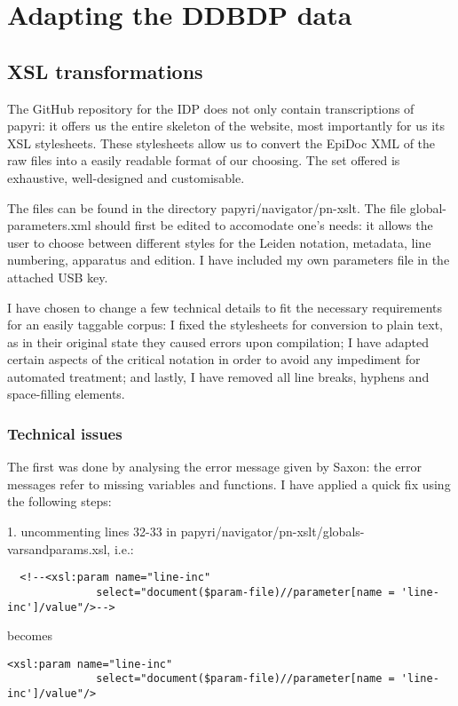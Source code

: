\chapter{Adapting the DDBDP data}
\label{chp:adaptation}
\minitoc\mtcskip
\section{XSL transformations}
\label{sect:xslt}
The GitHub repository for the IDP does not only contain transcriptions
of papyri: it offers us the entire skeleton of the website, most
importantly for us its XSL stylesheets. These stylesheets allow us to
convert the EpiDoc XML of the raw files into a easily readable format of
our choosing. The set offered is exhaustive, well-designed and
customisable.

The files can be found in the directory papyri/navigator/pn-xslt. The
file global-parameters.xml should first be edited to accomodate one's
needs: it allows the user to choose between different styles for the
Leiden notation, metadata, line numbering, apparatus and edition. I have
included my own parameters file in the attached USB key.

I have chosen to change a few technical details to fit the necessary requirements
for an easily taggable corpus: I fixed the stylesheets for conversion to
plain text, as in their original state they caused errors upon
compilation; I have adapted certain aspects of the critical notation
in order to avoid any impediment for automated treatment; and lastly,
I have removed all line breaks, hyphens and space-filling elements.

\subsection{Technical issues}
\label{subsect:techissues}
The first was done by analysing the error message given by Saxon: the
error messages refer to missing variables and functions. I have applied
a quick fix using the following steps:

1. uncommenting lines 32-33 in papyri/navigator/pn-xslt/globals-varsandparams.xsl, i.e.:

\begin{lstlisting}
  <!--<xsl:param name="line-inc"
              select="document($param-file)//parameter[name = 'line-inc']/value"/>-->
\end{lstlisting}
becomes
\begin{lstlisting}
<xsl:param name="line-inc"
              select="document($param-file)//parameter[name = 'line-inc']/value"/>
\end{lstlisting}

